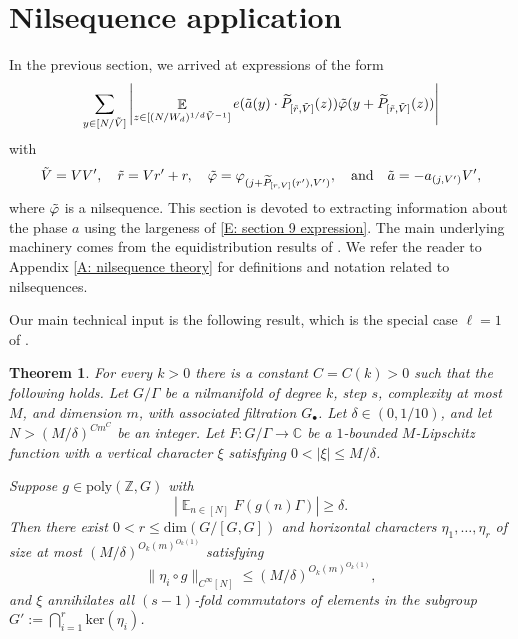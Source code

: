 \documentclass[11pt]{amsart}
\newtheorem{theorem}[lemma]{Theorem}
\theoremstyle{definition}
\DeclareMathOperator*{\E}{\mathbb{E}}
\newcommand{\abs}[1]{\mathopen{}\left| #1\mathclose{}\right|}
\begin{document}
\section{Nilsequence application}\label{S: nilsequence}
In the previous section, we arrived at expressions of the form
\begin{align}\label{E: section 9 expression}
    \sum_{y\in [N/\tilde{V}]}\left|\E_{z \in [(N/W_d)^{1/d}\tilde{V}^{-1}]} e(\tilde{a}(y)\cdot\widetilde{P}_{[\tilde{r},\tilde{V}]}(z))\tilde{\varphi}(y + \widetilde{P}_{[\tilde{r},\tilde{V}]}(z)) \vphantom{\E_{z \in [(N/W_d)^{1/d}\tilde{V}^{-1}]}} \right|
\end{align}
with
\begin{align*}
    \Tilde{V} = VV',\quad \tilde{r} =  Vr'+r,\quad \tilde{\varphi} = \varphi_{({j} + \widetilde{P}_{[r,V]}(r'), V')},\quad \textrm{and}\quad\tilde{a} = -a_{(j, V')}V',
\end{align*}
where $\Tilde{\varphi}$ is a nilsequence. This section is devoted to extracting information about the phase $a$ using the largeness of \eqref{E: section 9 expression}.  The main underlying machinery comes from the equidistribution results of \cite{Leng23b}.  We refer the reader to Appendix \ref{A: nilsequence theory} for definitions and notation related to nilsequences.


Our main technical input is the following result, which is the special case $\ell = 1$ of \cite[Theorem 3]{Leng23b}.

\begin{theorem}\label{multiparameter}
For every $k>0$ there is a constant $C = C(k)>0$ such that the following holds. Let $G/\Gamma$ be a nilmanifold of degree $k$, step $s$, complexity at most $M$, and dimension $m$, with associated filtration $G_\bullet$. Let $\delta\in (0,1/10)$, and let $N > (M/\delta)^{Cm^C}$ be an integer. Let $F:G/\Gamma \to \mathbb{C}$ be a $1$-bounded $M$-Lipschitz function with a vertical character $\xi$ satisfying $0<|\xi| \leq M/\delta$.

Suppose $g \in \mathrm{poly}(\mathbb{Z}, G)$ with
\[\abs{\E_{n \in [N]} F(g(n)\Gamma)} \ge \delta.\]
Then there exist $0< r\le \mathrm{dim}(G/[G,G])$ and horizontal characters $\eta_1, \dots, \eta_r$ of size at most $(M/\delta)^{O_k(m)^{O_k(1)}}$ satisfying
    \[\|\eta_i \circ g\|_{C^\infty[{N}]} \le (M/\delta)^{O_k(m)^{O_k(1)}},\]
    and $\xi$ annihilates all $(s-1)$-fold commutators of elements in the subgroup $G' := \bigcap_{i=1}^r\mathrm{ker}(\eta_i)$.
\end{theorem}
\end{document}
